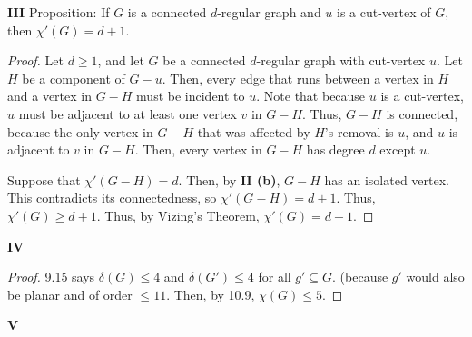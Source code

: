 \documentclass[12pt]{article}
\begin{document}
\medskip\noindent\textbf{III} Proposition: If $G$ is a connected $d$-regular graph and $u$ is a cut-vertex of $G$, then $\chi'(G) = d+1$.
\begin{proof}
    Let $d \geq 1$, and let $G$ be a connected $d$-regular graph with cut-vertex $u$.
    Let $H$ be a component of $G-u$.
    Then, every edge that runs between a vertex in $H$ and a vertex in $G-H$ must be incident to $u$.
    Note that because $u$ is a cut-vertex, $u$ must be adjacent to at least one vertex $v$ in $G-H$.
    Thus, $G-H$ is connected, because the only vertex in $G-H$ that was affected by $H$'s removal is $u$, and $u$ is adjacent to $v$ in $G-H$.
    Then, every vertex in $G-H$ has degree $d$ except $u$.

    Suppose that $\chi'(G-H) = d$.
    Then, by \textbf{II (b)}, $G - H$ has an isolated vertex.
    This contradicts its connectedness, so $\chi'(G-H) = d+1$.
    Thus, $\chi'(G) \geq d+1$.
    Thus, by Vizing's Theorem, $\chi'(G) = d + 1$.
\end{proof}

\medskip\noindent\textbf{IV}
\begin{proof}
    9.15 says $\delta(G) \leq 4$ and $\delta(G') \leq 4$ for all $g' \subseteq G$. (because $g'$ would also be planar and of order $\leq 11$.
    Then, by 10.9, $\chi(G) \leq 5$.
\end{proof}

\medskip\noindent\textbf{V}
\end{document}
